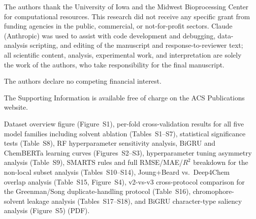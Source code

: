 \documentclass[journal=jcisd8,manuscript=article]{achemso}
\begin{document}
\begin{acknowledgement}
The authors thank the University of Iowa and the Midwest Bioprocessing Center for computational resources.
This research did not receive any specific grant from funding agencies in the public, commercial, or not-for-profit sectors.
Claude (Anthropic) was used to assist with code development and debugging, data-analysis scripting, and editing of the manuscript and response-to-reviewer text; all scientific content, analysis, experimental work, and interpretation are solely the work of the authors, who take responsibility for the final manuscript.
\end{acknowledgement}

The authors declare no competing financial interest.

\begin{suppinfo}
The Supporting Information is available free of charge on the ACS Publications website.

Dataset overview figure (Figure~S1), per-fold cross-validation results for all five model families including solvent ablation (Tables~S1--S7), statistical significance tests (Table~S8), RF hyperparameter sensitivity analysis, BiGRU and ChemBERTa learning curves (Figures~S2--S3), hyperparameter tuning asymmetry analysis (Table~S9), SMARTS rules and full RMSE/MAE/$R^2$ breakdown for the non-local subset analysis (Tables~S10--S14), Joung+Beard vs.\ Deep4Chem overlap analysis (Table~S15, Figure~S4), v2-vs-v3 cross-protocol comparison for the Greenman/Song duplicate-handling protocol (Table~S16), chromophore-solvent leakage analysis (Tables~S17--S18), and BiGRU character-type saliency analysis (Figure~S5) (PDF).
\end{suppinfo}


\end{document}
